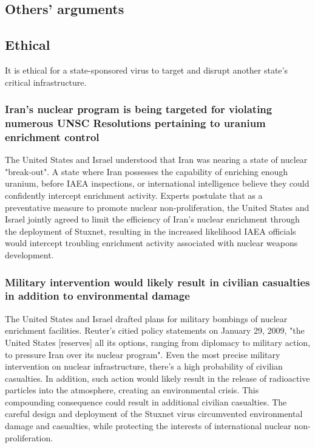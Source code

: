 \documentclass[12pt]{article}
\begin{document}
\begin{multicols}{2}
\section{Others' arguments}

\subsection{Ethical}

It is ethical for a state-sponsored virus to target and disrupt another state's critical infrastructure.

\subsubsection{Iran's nuclear program is being targeted for violating numerous UNSC Resolutions pertaining to uranium enrichment control}

The United States and Israel understood that Iran was nearing a state of nuclear "break-out". A state where Iran possesses the capability of enriching enough uranium, before IAEA inspections, or international intelligence believe they could confidently intercept enrichment activity. Experts postulate that as a preventative measure to promote nuclear non-proliferation, the United States and Israel jointly agreed to limit the efficiency of Iran's nuclear enrichment through the deployment of Stuxnet, resulting in the increased likelihood IAEA officials would intercept troubling enrichment activity associated with nuclear weapons development.\cite{theRealStoryOfStuxnet}

\subsubsection{Military intervention would likely result in civilian casualties in addition to environmental damage}

The United States and Israel drafted plans for military bombings of nuclear enrichment facilities. Reuter's citied policy statements on January 29, 2009, "the United States [reserves] all its options, ranging from diplomacy to military action, to pressure Iran over its nuclear program".\cite{usOptionsForIran} Even the most precise military intervention on nuclear infrastructure, there's a high probability of civilian casualties. In addition, such action would likely result in the release of radioactive particles into the atmosphere, creating an environmental crisis. This compounding consequence could result in additional civilian casualties. The careful design and deployment of the Stuxnet virus circumvented environmental damage and casualties, while protecting the interests of international nuclear non-proliferation.


\end{multicols}
\end{document}
